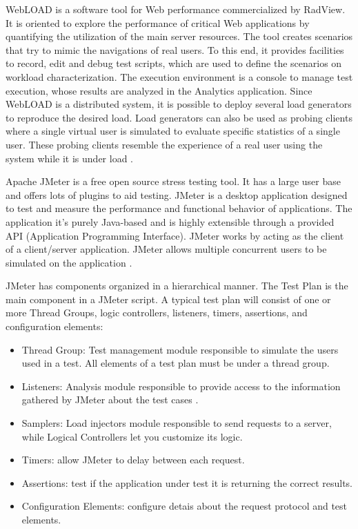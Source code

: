 WebLOAD is a software tool for Web performance commercialized by RadView. It is oriented to explore the performance of critical Web applications by quantifying the utilization of the main server resources. The tool creates scenarios that try to mimic the navigations of real users. To this end, it provides facilities to record, edit and debug test scripts, which are used to define the scenarios on workload characterization. The execution environment is a console to manage test execution, whose results are analyzed in the Analytics application. Since WebLOAD is a distributed system, it is possible to deploy several load generators to reproduce the desired load. Load generators can also be used as probing clients where a single virtual user is simulated to evaluate specific statistics of a single user. These probing clients resemble the experience of a real user using the system while it is under load \cite{MohammadS.Obaidat}.

Apache JMeter is a free open source stress testing tool.  It has a large user base and offers lots of plugins to aid testing. JMeter is a desktop application designed to test and measure the performance and functional behavior of applications. The application it's purely Java-based and is highly extensible through a provided API (Application Programming Interface). JMeter works by acting as the client of a client/server application. JMeter allows multiple concurrent users to be simulated on the application \cite{Halili2008} \cite{Erinle2013}. 

JMeter has components organized  in a hierarchical manner. The Test Plan is the main component in a JMeter script. A typical test plan will consist of one or more Thread Groups, logic controllers, listeners, timers, assertions, and configuration elements:

\begin{itemize}
\item Thread Group: Test management module responsible to simulate the users used in a test. All elements of a test plan must be under a thread group.
\item Listeners: Analysis module responsible to provide access to the information gathered by JMeter about the test cases .
\item Samplers: Load injectors module responsible to send requests to a server, while Logical Controllers let you customize its logic.
\item Timers: allow JMeter to delay between each request.
\item Assertions: test if the application under test it is returning the correct results.
\item Configuration Elements: configure detais about the request protocol and test elements.
\end{itemize}


